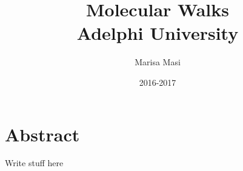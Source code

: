 \documentclass[12pt]{book}
\title{
        {\textbf {Molecular Walks}}\\
        {\large Adelphi University}\\
}
\author{Marisa Masi}
\date{2016-2017}
\begin{document}
\maketitle





\tableofcontents


\chapter*{Abstract}
Write stuff here











{}

\end{document}
